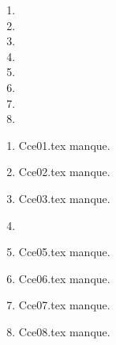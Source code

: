  
 
\begin{enumerate}
  \item  
  \item  
  \item  
  \item  
  \item  
  \item  
  \item  
  \item  
\end{enumerate} 
\clearpage 
{}
\begin{enumerate}
  \item Cce01.tex manque. 
  \item Cce02.tex manque. 
  \item Cce03.tex manque. 
  \item  
  \item Cce05.tex manque. 
  \item Cce06.tex manque. 
  \item Cce07.tex manque. 
  \item Cce08.tex manque. 
\end{enumerate} 
